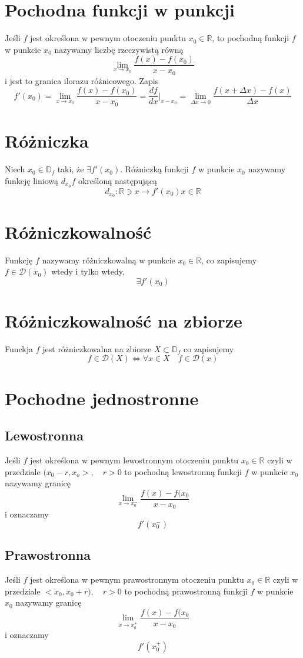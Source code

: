\documentclass[11pt]{article}
\begin{document}
\section{Pochodna funkcji w punkcji}
Jeśli $f$ jest określona w pewnym otoczeniu punktu $x_0 \in \mathbb{R}$, to pochodną funkcji $f$ w punkcie $x_0$ nazywamy liczbę rzeczywistą równą $$
\lim_{x \to x_0}{\frac{f(x) - f(x_0)}{x - x_0}} $$
i jest to granica ilorazu różnicowego.
Zapis $$ f'(x_0) =
\lim_{x \to x_0}{\frac{f(x) - f(x_0)}{x - x_0}}  =
\frac{df}{dx}|_{x-x_0} =
\lim_{\Delta x \to 0}{\frac{f(x + \Delta x) - f(x)}{\Delta x}}$$
\section{Różniczka}
Niech $x_0 \in \mathbb{D}_f$ taki, że $\exists f'(x_0)$. Różniczką funkcji $f$ w punkcie $x_0$ nazywamy funkcję liniową $d_{x_0}f$ określoną następującą $$ d_{x_0} : \mathbb{R} \ni x \to f'(x_0)x \in \mathbb{R}$$
\section{Różniczkowalność}
Funkcję $f$ nazywamy różniczkowalną w punkcie $x_0 \in \mathbb{R}$, co zapisujemy $ f \in \mathcal{D}(x_0)$ wtedy i tylko wtedy,
$$ \exists f'(x_0)$$ 
\section{Różniczkowalność na zbiorze}
Funckja $f$ jest różniczkowalna na zbiorze $X \subset \mathbb{D}_f$ co zapisujemy $$ f \in \mathcal{D}(X) \iff \forall x \in X \quad f \in \mathcal{D}(x)$$
\section{Pochodne jednostronne}
\subsection{Lewostronna}
Jeśli $f$ jest określona w pewnym lewostronnym otoczeniu punktu $x_0 \in \mathbb{R}$ czyli w przedziale $(x_0 -r , x_o>,\quad r > 0$ to pochodną lewostronną funkcji $f$ w punkcie $x_0$ nazywamy granicę $$ \lim_{x \to x_0^-}{\frac{f(x) - f(x_0}{x - x_0}}$$ i oznaczamy $$ f'(x_0^-)$$
\subsection{Prawostronna }
Jeśli $f$ jest określona w pewnym prawostronnym otoczeniu punktu $x_0 \in \mathbb{R}$ czyli w przedziale $<x_0,x_0+r),\quad r > 0$ to pochodną prawostronną funkcji $f$ w punkcie $x_0$ nazywamy granicę $$ \lim_{x \to x_0^+}{\frac{f(x) - f(x_0}{x - x_0}}$$ i oznaczamy $$ f'(x_0^+)$$
\end{document}
